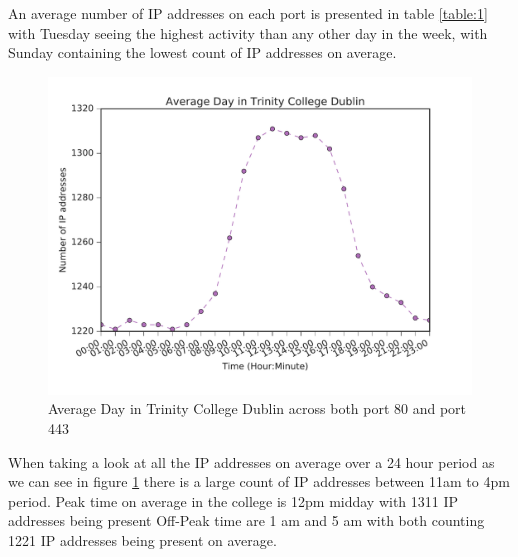 \documentclass[a4wide,leqno,12pt]{report}
\begin{document}
An average number of IP addresses on each port is presented in table \ref{table:1} with Tuesday seeing the highest activity than any other day in the week, with Sunday containing the lowest count of IP addresses on average.

\begin{figure}[H]
\centering
\includegraphics[scale=.5]{pdf_images/AverageDayinTrinityCollegeDublin}
\caption{Average Day in Trinity College Dublin across both port 80 and port 443}
\label{fig:average_day}
\end{figure}
When taking a look at all the IP addresses on average over a 24 hour period as we can see in figure \ref{fig:average_day} there is a large count of IP addresses between 11am to 4pm period. Peak time on average in the college is 12pm midday with 1311 IP addresses being present
Off-Peak time are 1 am and 5 am with both counting 1221 IP addresses being present on average.
 
\end{document}
